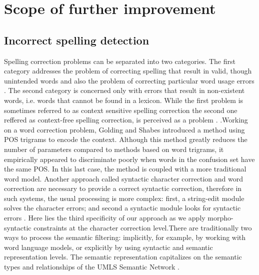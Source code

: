 \section{Scope of further improvement}
\subsection{Incorrect spelling detection}
Spelling correction problem\cite{Ruch2003SpellingCorrectionEPR}s can be separated into two categories. The first category
addresses the problem of correcting spelling that result in valid, though unintended words
 and also the problem of
correcting particular word usage errors . The second category
is concerned only with errors that result in non-existent words, i.e. words that cannot be
found in a lexicon. While the first problem is sometimes referred to as context sensitive
spelling correction the second one reffered as 
 context-free spelling correction, is perceived as a problem .
.Working on a word correction problem, Golding and Shabes  introduced a method
using POS trigrams
to encode the context. Although this method greatly reduces the
number of parameters compared to methods based on word trigrams,
it empirically
appeared to discriminate poorly when words in the confusion set have the same POS. In
 this last case, the method is coupled with a more traditional word model. Another approach called syntactic character correction and word correction are necessary to provide a correct
syntactic correction, therefore in such systems, the usual processing is more complex: first,
a string-edit module solves the character errors; and second a syntactic module looks for syntactic errors . Here lies the third specificity of our approach as we apply morpho-
syntactic constraints at the character correction level.There are traditionally two ways to process the semantic filtering: implicitly, for
example, by working with word language models, or explicitly by using syntactic and
semantic representation levels. The semantic representation  capitalizes
on the  semantic types and  relationships of the UMLS Semantic Network . 
